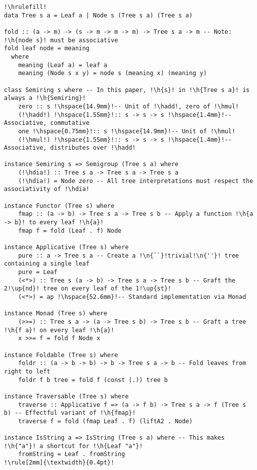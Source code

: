 \documentclass[crc,english]{programming}
\newcommand{\code}[1]{\lstinline[mathescape]|#1|}
\newcommand{\h}[1]{{\itshape\color{grayblue}#1}} %
\newcommand{\n}[1]{{\itshape\color{graygreen}#1}} %
\newcommand{\up}[1]{{\itshape\color{graygreen}\textsuperscript{#1}}}
\newcommand{\hadd}{{\large\color{darkblue} $\oplus$}}
\newcommand{\hmul}{{\large\color{darkblue} $\otimes$}}
\newcommand{\hdia}{\,\text{\raisebox{-0.2mm}{\Large\color{darkblue} $\diamond$}}\,}
\begin{document}
\begin{lstlisting}[float,label=lst-tree-std,xleftmargin=0pt,caption={
    The \code{Tree} data type and instances of various standard Haskell type classes.
}]
!\hrulefill!
data Tree s a = Leaf a | Node s (Tree s a) (Tree s a)

fold :: (a -> m) -> (s -> m -> m -> m) -> Tree s a -> m -- Note: !\h{node s}! must be associative
fold leaf node = meaning
  where
    meaning (Leaf a) = leaf a
    meaning (Node s x y) = node s (meaning x) (meaning y)

class Semiring s where -- In this paper, !\h{s}! in !\h{Tree s a}! is always a !\h{Semiring}!
    zero :: s !\hspace{14.9mm}!-- Unit of !\hadd!, zero of !\hmul!
    (!\hadd!) !\hspace{1.55mm}!:: s -> s -> s !\hspace{1.4mm}!-- Associative, commutative
    one !\hspace{0.75mm}!:: s !\hspace{14.9mm}!-- Unit of !\hmul!
    (!\hmul!) !\hspace{1.55mm}!:: s -> s -> s !\hspace{1.4mm}!-- Associative, distributes over !\hadd!

instance Semiring s => Semigroup (Tree s a) where
    (!\hdia!) :: Tree s a -> Tree s a -> Tree s a
    (!\hdia!) = Node zero -- All tree interpretations must respect the associativity of !\hdia!

instance Functor (Tree s) where
    fmap :: (a -> b) -> Tree s a -> Tree s b -- Apply a function !\h{a -> b}! to every leaf !\h{a}!
    fmap f = fold (Leaf . f) Node

instance Applicative (Tree s) where
    pure :: a -> Tree s a -- Create a !\n{``}!trivial!\n{''}! tree containing a single leaf
    pure = Leaf
    (<*>) :: Tree s (a -> b) -> Tree s a -> Tree s b -- Graft the 2!\up{nd}! tree on every leaf of the 1!\up{st}!
    (<*>) = ap !\hspace{52.6mm}!-- Standard implementation via Monad

instance Monad (Tree s) where
    (>>=) :: Tree s a -> (a -> Tree s b) -> Tree s b -- Graft a tree !\h{f a}! on every leaf !\h{a}!
    x >>= f = fold f Node x

instance Foldable (Tree s) where
    foldr :: (a -> b -> b) -> b -> Tree s a -> b -- Fold leaves from right to left
    foldr f b tree = fold f (const (.)) tree b

instance Traversable (Tree s) where
    traverse :: Applicative f => (a -> f b) -> Tree s a -> f (Tree s b) -- Effectful variant of !\h{fmap}!
    traverse f = fold (fmap Leaf . f) (liftA2 . Node)

instance IsString a => IsString (Tree s a) where -- This makes !\h{"a"}! a shortcut for !\h{Leaf "a"}!
    fromString = Leaf . fromString
!\rule[2mm]{\textwidth}{0.4pt}!
\end{lstlisting}
\end{document}
